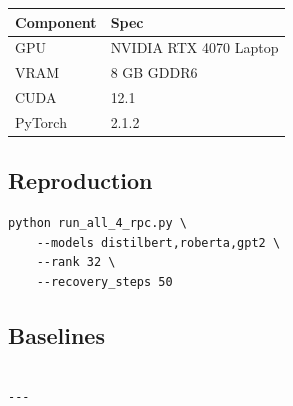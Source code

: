 \begin{table}[H]
\centering
\small
\begin{tabular}{ll}
\toprule
\textbf{Component} & \textbf{Spec} \\
\midrule
GPU & NVIDIA RTX 4070 Laptop \\
VRAM & 8 GB GDDR6 \\
CUDA & 12.1 \\
PyTorch & 2.1.2 \\
\bottomrule
\end{tabular}
\end{table}

\subsection{Reproduction}

\begin{lstlisting}
python run_all_4_rpc.py \
    --models distilbert,roberta,gpt2 \
    --rank 32 \
    --recovery_steps 50
\end{lstlisting}

\subsection{Baselines}

\begin{lstlisting}

---
\end{lstlisting}